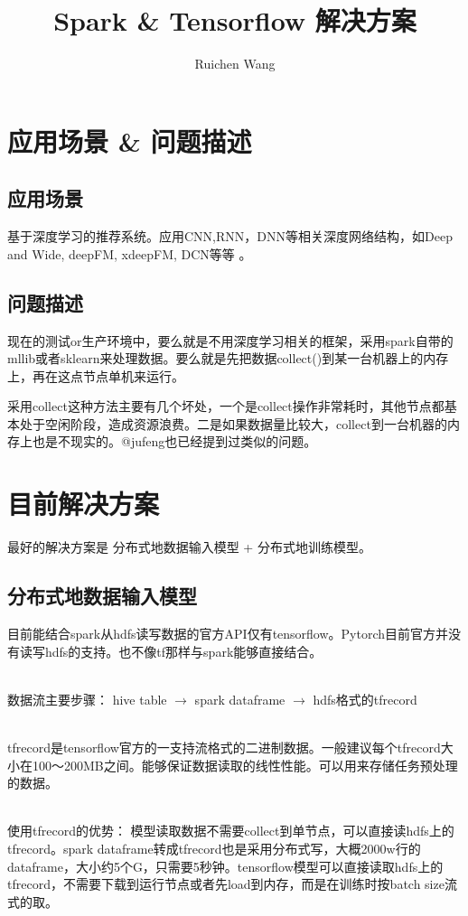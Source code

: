 \documentclass[12pt,a4paper,oneside]{article}
\author{Ruichen Wang}
\title{Spark \&  Tensorflow 解决方案}
\begin{document}
\begin{CJK*}{UTF8}{gbsn}

\maketitle

\section{应用场景 \& 问题描述}
\subsection{应用场景}  

基于深度学习的推荐系统。应用CNN,RNN，DNN等相关深度网络结构，如Deep and Wide, deepFM, xdeepFM, DCN等等 。

\subsection{问题描述}  
现在的测试or生产环境中，要么就是不用深度学习相关的框架，采用spark自带的mllib或者sklearn来处理数据。要么就是先把数据collect()到某一台机器上的内存上，再在这点节点单机来运行。

采用collect这种方法主要有几个坏处，一个是collect操作非常耗时，其他节点都基本处于空闲阶段，造成资源浪费。二是如果数据量比较大，collect到一台机器的内存上也是不现实的。@jufeng也已经提到过类似的问题。

\section{目前解决方案}
最好的解决方案是 分布式地数据输入模型 + 分布式地训练模型。 
\subsection{分布式地数据输入模型}

目前能结合spark从hdfs读写数据的官方API仅有tensorflow。Pytorch目前官方并没有读写hdfs的支持。也不像tf那样与spark能够直接结合。

~\\
数据流主要步骤：
hive table $\rightarrow$ spark dataframe $\rightarrow$ hdfs格式的tfrecord

~\\
tfrecord是tensorflow官方的一支持流格式的二进制数据。一般建议每个tfrecord大小在100～200MB之间。能够保证数据读取的线性性能。可以用来存储任务预处理的数据。

~\\
使用tfrecord的优势： 模型读取数据不需要collect到单节点，可以直接读hdfs上的tfrecord。spark dataframe转成tfrecord也是采用分布式写，大概2000w行的dataframe，大小约5个G，只需要5秒钟。tensorflow模型可以直接读取hdfs上的tfrecord，不需要下载到运行节点或者先load到内存，而是在训练时按batch size流式的取。


\end{CJK*}
\end{document}
